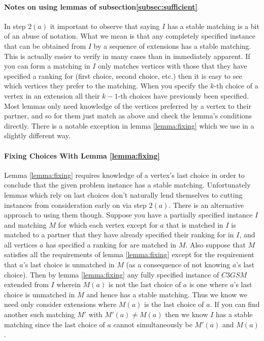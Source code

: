 \paragraph{Notes on using lemmas of subsection\ref{subsec:sufficient}}
In step $2(a)$ it important to observe that saying $I$ has a stable matching is a bit of an abuse of notation. What we mean is that any completely specified instance that can be obtained from $I$ by a sequence of extensions has a stable matching. This is actually easier to verify in many cases than in immediately apparent. If you can form a matching in $I$ only  matches vertices with those that they have specified a ranking for (first choice, second choice, etc.) then it is easy to see which vertices they prefer to the matching. When you specify the $k$-th choice of a vertex in an extension all their $k-1$-th choices have previously been specified. Most lemmas only need knowledge of the vertices preferred by a vertex to their partner, and so for them just match as above and check the lemma's conditions directly. There is a notable exception in lemma \ref{lemma:fixing} which we use in a slightly different way.
\paragraph{Fixing Choices With Lemma \ref{lemma:fixing}}
Lemma \ref{lemma:fixing} requires knowledge of a vertex's last choice in order to conclude that the given problem instance has a stable matching. Unfortunately lemmas which rely on last choices don't naturally lend themselves to cutting instances from consideration early on via step $2(a)$. There is an alternative approach to using them though. Suppose you have a partially specified instance $I$ and matching $M$ for which each vertex except for $a$ that is matched in $I$ is matched to a partner that they have already specified their ranking for in $I$, and all vertices $a$ has specified a ranking for are matched in $M$. Also suppose that $M$ satisfies all the requirements of lemma \ref{lemma:fixing} except for the requirement that $a$'s last choice is unmatched in $M$ (as a consequence of not knowing $a$'s last choice). Then by lemma \ref{lemma:fixing} any fully specified instance of $C3GSM$ extended from $I$ wherein $M(a)$ is not the last choice of $a$ is one where $a$'s last choice is unmatched in $M$ and hence has a stable matching. Thus we know we need only consider extensions where $M(a)$ is the last choice of $a$. If you can find another such matching $M'$ with $M'(a) \neq M(a)$ then we know $I$ has a stable matching since the last choice of $a$ cannot simultaneously be $M'(a)$ and $M(a)$.